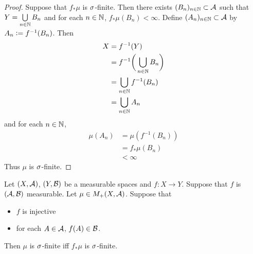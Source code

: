 \documentclass{book}
\begin{document}
\begin{proof}
	Suppose that $f_*\mu$ is $\sigma$-finite. Then there exists $(B_n)_{n \in \mathbb{N}} \subset \mathcal{A}$ such that $Y = \bigcup\limits_{n \in \mathbb{N}} B_n$ and for each $n \in \mathbb{N}$, $f_*\mu(B_n) < \infty$. Define $(A_n)_{n \in \mathbb{N}} \subset \mathcal{A}$ by $A_n \vcentcolon= f^{-1}(B_n)$. Then 
	\begin{align*}
		X
		& = f^{-1}(Y) \\
		& =  f^{-1} \bigg( \bigcup\limits_{n \in \mathbb{N}} B_n \bigg) \\
		& =  \bigcup\limits_{n \in \mathbb{N}} f^{-1}(B_n) \\
		& =  \bigcup_{n \in \mathbb{N}} A_n \\
	\end{align*}
	and for each $n \in \mathbb{N}$,
	\begin{align*}
		\mu(A_n)
		& = \mu(f^{-1}(B_n)) \\
		& = f_*\mu(B_n) \\
		& < \infty 
	\end{align*}
	Thus $\mu$ is $\sigma$-finite.
\end{proof}

\begin{ex} 
	Let $(X, \mathcal{A})$, $(Y, \mathcal{B})$ be a measurable spaces and $f: X \rightarrow Y$. Suppose that $f$ is $(\mathcal{A}, \mathcal{B})$ measurable. Let $\mu \in M_+(X, \mathcal{A})$. Suppose that 
	\begin{itemize}
		\item $f$ is injective
		\item for each $A \in \mathcal{A}$, $f(A) \in \mathcal{B}$.
	\end{itemize} 
	Then $\mu$ is $\sigma$-finite iff $f_*\mu$ is $\sigma$-finite.
\end{ex}
\end{document}
